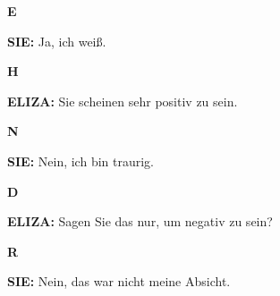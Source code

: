 \documentclass{article}
\begin{document}
\vspace{0.5cm}

\begin{minipage}[t]{0.13\textwidth}
  \centering
  {\bfseries\fontsize{14.4}{14.4}\selectfont\textcolor{pastelblue}{E}}
\end{minipage}%
\begin{minipage}[t]{0.81\textwidth}
  \textbf{SIE:} Ja, ich weiß.
\end{minipage}

\vspace{0.5cm}

\begin{minipage}[t]{0.13\textwidth}
  \centering
  {\bfseries\fontsize{14.4}{14.4}\selectfont\textcolor{pastelblue}{H}}
\end{minipage}%
\begin{minipage}[t]{0.81\textwidth}
  \textbf{ELIZA:} Sie scheinen sehr positiv zu sein.
\end{minipage}

\vspace{0.5cm}

\begin{minipage}[t]{0.13\textwidth}
  \centering
  {\bfseries\fontsize{14.4}{14.4}\selectfont\textcolor{pastelblue}{N}}
\end{minipage}%
\begin{minipage}[t]{0.81\textwidth}
  \textbf{SIE:} Nein, ich bin traurig.
\end{minipage}

\vspace{0.5cm}

\begin{minipage}[t]{0.13\textwidth}
  \centering
  {\bfseries\fontsize{14.4}{14.4}\selectfont\textcolor{pastelblue}{D}}
\end{minipage}%
\begin{minipage}[t]{0.81\textwidth}
  \textbf{ELIZA:} Sagen Sie das nur, um negativ zu sein?
\end{minipage}

\vspace{0.5cm}

\begin{minipage}[t]{0.13\textwidth}
  \centering
  {\bfseries\fontsize{14.4}{14.4}\selectfont\textcolor{pastelblue}{R}}
\end{minipage}%
\begin{minipage}[t]{0.81\textwidth}
  \textbf{SIE:} Nein, das war nicht meine Absicht.
\end{minipage}
\end{document}

